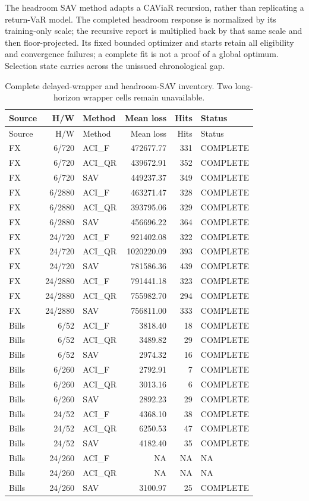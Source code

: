 \documentclass[11pt,a4paper]{article}
\begin{document}
The headroom SAV method adapts a CAViaR recursion, rather than replicating a
return-VaR model. The completed headroom response is normalized by its
training-only scale; the recursive report is multiplied back by that same
scale and then floor-projected. Its fixed bounded optimizer and starts retain
all eligibility and convergence failures; a complete fit is not a proof of a
global optimum. Selection state carries across the unissued chronological gap.
\begingroup
\scriptsize
\setlength{\tabcolsep}{3pt}
\renewcommand{\arraystretch}{1.12}
\begin{longtable}{lrlrrl}
\caption{Complete delayed-wrapper and headroom-SAV inventory. Two long-horizon wrapper cells remain unavailable.}\\
\toprule
Source & H/W & Method & Mean loss & Hits & Status \\
\midrule
\endfirsthead
\toprule
Source & H/W & Method & Mean loss & Hits & Status \\
\midrule
\endhead
\bottomrule
\endfoot
FX & 6/720 & ACI\_F & 472677.77 & 331 & COMPLETE \\
FX & 6/720 & ACI\_QR & 439672.91 & 352 & COMPLETE \\
FX & 6/720 & SAV & 449237.37 & 349 & COMPLETE \\
FX & 6/2880 & ACI\_F & 463271.47 & 328 & COMPLETE \\
FX & 6/2880 & ACI\_QR & 393795.06 & 329 & COMPLETE \\
FX & 6/2880 & SAV & 456696.22 & 364 & COMPLETE \\
FX & 24/720 & ACI\_F & 921402.08 & 322 & COMPLETE \\
FX & 24/720 & ACI\_QR & 1020220.09 & 393 & COMPLETE \\
FX & 24/720 & SAV & 781586.36 & 439 & COMPLETE \\
FX & 24/2880 & ACI\_F & 791441.18 & 323 & COMPLETE \\
FX & 24/2880 & ACI\_QR & 755982.70 & 294 & COMPLETE \\
FX & 24/2880 & SAV & 756811.00 & 333 & COMPLETE \\
Bills & 6/52 & ACI\_F & 3818.40 & 18 & COMPLETE \\
Bills & 6/52 & ACI\_QR & 3489.82 & 29 & COMPLETE \\
Bills & 6/52 & SAV & 2974.32 & 16 & COMPLETE \\
Bills & 6/260 & ACI\_F & 2792.91 & 7 & COMPLETE \\
Bills & 6/260 & ACI\_QR & 3013.16 & 6 & COMPLETE \\
Bills & 6/260 & SAV & 2892.23 & 29 & COMPLETE \\
Bills & 24/52 & ACI\_F & 4368.10 & 38 & COMPLETE \\
Bills & 24/52 & ACI\_QR & 6250.53 & 47 & COMPLETE \\
Bills & 24/52 & SAV & 4182.40 & 35 & COMPLETE \\
Bills & 24/260 & ACI\_F & NA & NA & NA \\
Bills & 24/260 & ACI\_QR & NA & NA & NA \\
Bills & 24/260 & SAV & 3100.97 & 25 & COMPLETE \\
\end{longtable}
\endgroup
\end{document}
